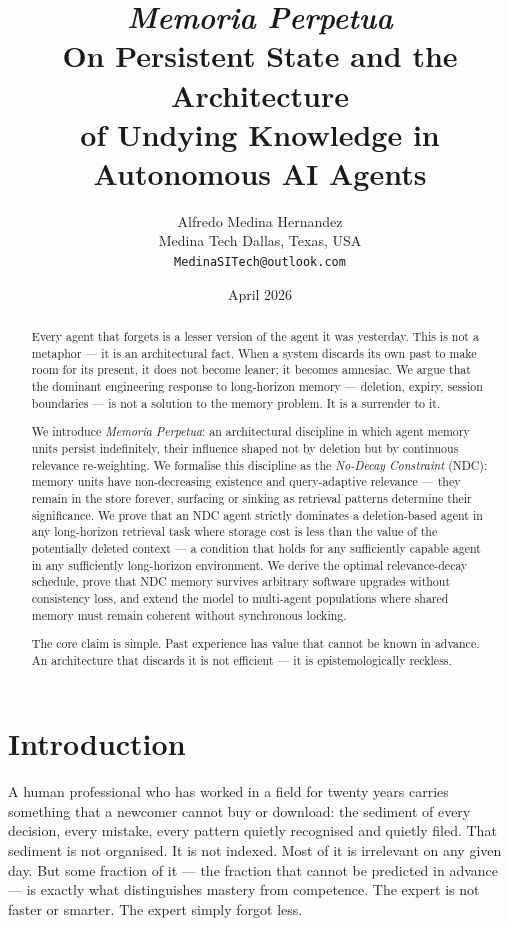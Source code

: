 \documentclass[12pt]{article}
\title{\textbf{\textit{Memoria Perpetua} \\
  \normalfont\large On Persistent State and the Architecture \\
  of Undying Knowledge in Autonomous AI Agents}}
\author{Alfredo Medina Hernandez \\
  \normalsize Medina Tech \quad Dallas, Texas, USA \\
  \normalsize \texttt{MedinaSITech@outlook.com}}
\date{April 2026}
\begin{document}
\maketitle

\begin{abstract}
Every agent that forgets is a lesser version of the agent it was yesterday.
This is not a metaphor — it is an architectural fact.  When a system discards
its own past to make room for its present, it does not become leaner; it
becomes amnesiac.  We argue that the dominant engineering response to
long-horizon memory — deletion, expiry, session boundaries — is not a solution
to the memory problem.  It is a surrender to it.

We introduce \emph{Memoria Perpetua}: an architectural discipline in which
agent memory units persist indefinitely, their influence shaped not by deletion
but by continuous relevance re-weighting.  We formalise this discipline as the
\emph{No-Decay Constraint} (NDC): memory units have non-decreasing existence
and query-adaptive relevance — they remain in the store forever, surfacing or
sinking as retrieval patterns determine their significance.  We prove that an
NDC agent strictly dominates a deletion-based agent in any long-horizon
retrieval task where storage cost is less than the value of the potentially
deleted context — a condition that holds for any sufficiently capable agent in
any sufficiently long-horizon environment.  We derive the optimal relevance-decay
schedule, prove that NDC memory survives arbitrary software upgrades without
consistency loss, and extend the model to multi-agent populations where shared
memory must remain coherent without synchronous locking.

The core claim is simple.  Past experience has value that cannot be known in
advance.  An architecture that discards it is not efficient — it is
epistemologically reckless.
\end{abstract}

\section{Introduction}
\label{sec:intro}

A human professional who has worked in a field for twenty years carries
something that a newcomer cannot buy or download: the sediment of every
decision, every mistake, every pattern quietly recognised and quietly filed.
That sediment is not organised.  It is not indexed.  Most of it is irrelevant
on any given day.  But some fraction of it — the fraction that cannot be
predicted in advance — is exactly what distinguishes mastery from competence.
The expert is not faster or smarter.  The expert simply forgot less.
\end{document}
